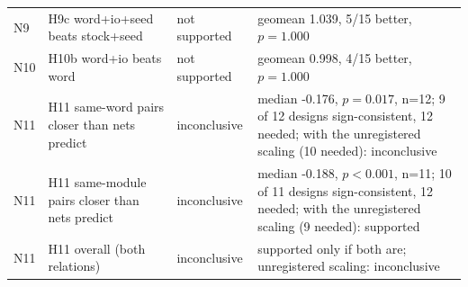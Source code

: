 \begin{table}[t]
\begin{tabular}{@{}lp{5.4cm}p{3.4cm}p{6.6cm}@{}}
N9 & H9c word+io+seed beats stock+seed & not supported & geomean 1.039, 5/15 better, $p=1.000$ \\
N10 & H10b word+io beats word & not supported & geomean 0.998, 4/15 better, $p=1.000$ \\
N11 & H11 same-word pairs closer than nets predict & inconclusive & median -0.176, $p=0.017$, n=12; 9 of 12 designs sign-consistent, 12 needed; with the unregistered scaling (10 needed): inconclusive \\
N11 & H11 same-module pairs closer than nets predict & inconclusive & median -0.188, $p<0.001$, n=11; 10 of 11 designs sign-consistent, 12 needed; with the unregistered scaling (9 needed): supported \\
N11 & H11 overall (both relations) & inconclusive & supported only if both are; unregistered scaling: inconclusive \\
\bottomrule
\end{tabular}
\end{table}

